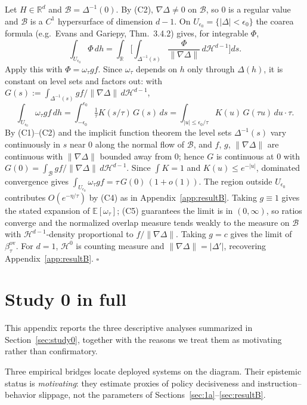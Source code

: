 \documentclass[11pt]{article}
\theoremstyle{definition}
\theoremstyle{remark}
\newcommand{\E}{\mathbb{E}}
\newcommand{\ov}{\mathrm{ov}}
\begin{document}
Let $H \in \mathbb{R}^d$ and $\mathcal{B} = \Delta^{-1}(0)$. By (C2),
$\nabla\Delta \neq 0$ on $\mathcal{B}$, so $0$ is a regular value and
$\mathcal{B}$ is a $C^1$ hypersurface of dimension $d-1$. On $U_{\epsilon_0}
= \{|\Delta| < \epsilon_0\}$ the coarea formula (e.g.\ Evans and Gariepy,
Thm.\ 3.4.2) gives, for integrable $\Phi$,
\[
\int_{U_{\epsilon_0}} \Phi \,dh
= \int_{\mathbb{R}} \Big[ \int_{\Delta^{-1}(s)}
\frac{\Phi}{\|\nabla\Delta\|}\,d\mathcal{H}^{d-1}\Big] ds .
\]
Apply this with $\Phi = \omega_\tau g f$. Since $\omega_\tau$ depends on $h$
only through $\Delta(h)$, it is constant on level sets and factors out:
with $G(s) := \int_{\Delta^{-1}(s)} gf/\|\nabla\Delta\|
\,d\mathcal{H}^{d-1}$,
\[
\int_{U_{\epsilon_0}} \omega_\tau g f \,dh
= \int_{-\epsilon_0}^{\epsilon_0} \tfrac{1}{\tau}K(s/\tau)\,G(s)\,ds
= \int_{|u| \leq \epsilon_0/\tau} K(u)\,G(\tau u)\,du \cdot \tau .
\]
By (C1)--(C2) and the implicit function theorem the level sets
$\Delta^{-1}(s)$ vary continuously in $s$ near $0$ along the normal flow of
$\mathcal{B}$, and $f$, $g$, $\|\nabla\Delta\|$ are continuous with
$\|\nabla\Delta\|$ bounded away from $0$; hence $G$ is continuous at $0$
with $G(0) = \int_{\mathcal{B}} gf/\|\nabla\Delta\| \,d\mathcal{H}^{d-1}$.
Since $\int K = 1$ and $K(u) \leq e^{-|u|}$, dominated convergence gives
$\int_{U_{\epsilon_0}} \omega_\tau g f = \tau\,G(0)\,(1 + o(1))$. The region
outside $U_{\epsilon_0}$ contributes $O(e^{-\eta/\tau})$ by (C4) as in
Appendix~\ref{app:resultB}. Taking $g \equiv 1$ gives the stated expansion
of $\E[\omega_\tau]$; (C5) guarantees the limit is in $(0,\infty)$, so
ratios converge and the normalized overlap measure tends weakly to the
measure on $\mathcal{B}$ with $\mathcal{H}^{d-1}$-density proportional to
$f/\|\nabla\Delta\|$. Taking $g = c$ gives the limit of $\beta^{\ov}_\tau$.
For $d = 1$, $\mathcal{H}^0$ is counting measure and $\|\nabla\Delta\| =
|\Delta'|$, recovering Appendix~\ref{app:resultB}. \hfill$\square$

\section{Study 0 in full}\label{app:study0}

This appendix reports the three descriptive analyses summarized in
Section~\ref{sec:study0}, together with the reasons we treat them as
motivating rather than confirmatory.


Three empirical bridges locate deployed systems on the diagram. Their
epistemic status is \emph{motivating}: they estimate proxies of policy
decisiveness and instruction--behavior slippage, not the parameters of
Sections~\ref{sec:1a}--\ref{sec:resultB}.
\end{document}
